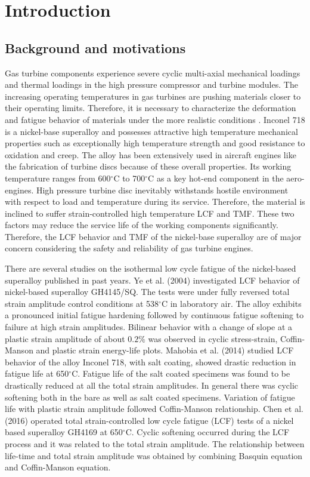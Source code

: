 \chapter{Introduction}
\section{Background and motivations}
\noindent
Gas turbine components experience severe cyclic multi-axial mechanical loadings and thermal loadings in the high pressure compressor and turbine modules.
The increasing operating temperatures in gas turbines are pushing materials closer to their operating limits.
Therefore, it is necessary to characterize the deformation and fatigue behavior of materials under the more realistic conditions \cite{harrison1996modelling}.
Inconel 718 is a nickel-base superalloy and possesses attractive high temperature mechanical properties such as exceptionally high temperature strength and good resistance to oxidation and creep.
The alloy has been extensively used in aircraft engines like the fabrication of turbine discs because of these overall properties. Its working temperature ranges from 600$^{\circ}$C to 700$^{\circ}$C as a key hot-end component in the aero-engines.
High pressure turbine disc inevitably withstands hostile environment with respect to load and temperature during its service. Therefore, the material is inclined to suffer strain-controlled high temperature LCF and TMF.
These two factors may reduce the service life of the working components significantly.
Therefore, the LCF behavior and TMF of the nickel-base superalloy are of major concern considering the safety and reliability of gas turbine engines.

There are several studies on the isothermal low cycle fatigue of the nickel-based superalloy published in past years.
Ye et al. (2004) \cite{ye2004low} investigated LCF behavior of nickel-based superalloy GH4145/SQ. The tests were under fully reversed total strain amplitude control conditions at 538$^{\circ}$C in laboratory air. The alloy exhibits a pronounced initial fatigue hardening followed by continuous fatigue softening to failure at high strain amplitudes. Bilinear behavior with a change of slope at a plastic strain amplitude of about $0.2\%$ was observed in cyclic stress-strain, Coffin-Manson and plastic strain energy-life plots.
Mahobia et al. (2014) \cite{mahobia2014effect} studied LCF behavior of the alloy Inconel 718, with salt coating, showed drastic reduction in fatigue life at 650$^{\circ}$C. Fatigue life of the salt coated specimens was found to be drastically reduced at all the total strain amplitudes. In general there was cyclic softening both in the bare as well as salt coated specimens. Variation of fatigue life with plastic strain amplitude followed Coffin-Manson relationship.
Chen et al. (2016) \cite{Chen2016175} operated total strain-controlled low cycle fatigue (LCF) tests of a nickel based superalloy GH4169 at 650$^{\circ}$C. Cyclic softening occurred during the LCF process and it was related to the total strain amplitude. The relationship between life-time and total strain amplitude was obtained by combining Basquin equation and Coffin-Manson equation.


